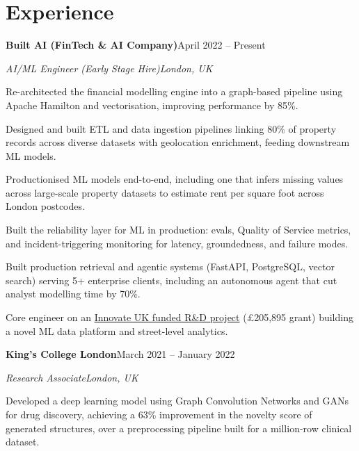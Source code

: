 \documentclass[10pt,a4paper]{article}
\newcommand{\entry}[4]{%
  {\color{company}\bfseries #1}\hfill {\color{muted}#2}\par
  \vspace{1pt}
  {\itshape #3}\hfill {\color{muted}\itshape #4}\par
  \vspace{3pt}%
}
\begin{document}
\section{Experience}
\entry{Built AI (FinTech \& AI Company)}{April 2022 -- Present}{AI/ML Engineer (Early Stage Hire)}{London, UK}
\begin{tight}
  \item Re-architected the financial modelling engine into a graph-based pipeline using Apache Hamilton and vectorisation, improving performance by 85\%.
  \item Designed and built ETL and data ingestion pipelines linking 80\% of property records across diverse datasets with geolocation enrichment, feeding downstream ML models.
  \item Productionised ML models end-to-end, including one that infers missing values across large-scale property datasets to estimate rent per square foot across London postcodes.
  \item Built the reliability layer for ML in production: evals, Quality of Service metrics, and incident-triggering monitoring for latency, groundedness, and failure modes.
  \item Built production retrieval and agentic systems (FastAPI, PostgreSQL, vector search) serving 5+ enterprise clients, including an autonomous agent that cut analyst modelling time by 70\%.
  \item Core engineer on an \href{https://gtr.ukri.org/projects?ref=10022996}{Innovate UK funded R\&D project} (\pounds205,895 grant) building a novel ML data platform and street-level analytics.
\end{tight}

\entry{King's College London}{March 2021 -- January 2022}{Research Associate}{London, UK}
\begin{tight}
  \item Developed a deep learning model using Graph Convolution Networks and GANs for drug discovery, achieving a 63\% improvement in the novelty score of generated structures, over a preprocessing pipeline built for a million-row clinical dataset.
\end{tight}

\end{document}
